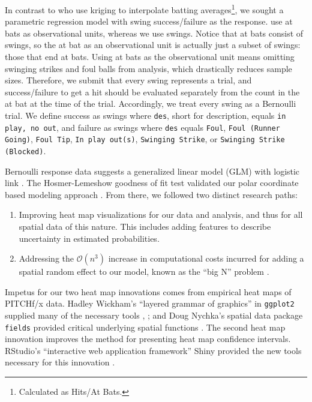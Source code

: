 In contrast to \cite{Cross2015} who use kriging to interpolate batting averages\footnote{Calculated as Hits/At Bats.}, we sought a parametric regression model with swing success/failure as the response. \cite{Cross2015} use at bats as observational units, whereas we use swings. Notice that at bats consist of swings, so the at bat as an observational unit is actually just a subset of swings: those that end at bats. Using at bats as the observational unit means omitting swinging strikes and foul balls from analysis, which drastically reduces sample sizes. Therefore, we submit that every swing represents a trial, and success/failure to get a hit should be evaluated separately from the count in the at bat at the time of the trial. Accordingly, we treat every swing as a Bernoulli trial. We define success as swings where \verb|des|, short for description, equals \verb|in play, no out|, and failure as swings where \verb|des| equals \verb|Foul|, \verb|Foul (Runner Going)|, \verb|Foul Tip|, \verb|In play out(s)|, \verb|Swinging Strike|, or \verb|Swinging Strike (Blocked)|.

Bernoulli response data suggests a generalized linear model (GLM) with logistic link \citep{Myers2012}. The Hosmer-Lemeshow goodness of fit test validated our polar coordinate based modeling approach \citep{Hosmer2013}. From there, we followed two distinct research paths:
\begin{enumerate}
\item Improving heat map visualizations for our data and analysis, and thus for all spatial data of this nature. This includes adding features to describe uncertainty in estimated probabilities.
\item Addressing the $\mathcal{O}(n^{3})$ increase in computational costs incurred for adding a spatial random effect to our model, known as the ``big N'' problem \citep{Finley2009}. 
\end{enumerate}
Impetus for our two heat map innovations comes from empirical heat maps of PITCHf/x\textsuperscript{\textregistered} data. Hadley Wickham's ``layered grammar of graphics'' in \verb|ggplot2| supplied many of the necessary tools \citep{Wickham2009}, \citep{Wickham2010}; and Doug Nychka's spatial data package \verb|fields| provided critical underlying spatial functions \citep{Nychka}. The second heat map innovation improves the method for presenting heat map confidence intervals. RStudio's ``interactive web application framework'' Shiny provided the new tools necessary for this innovation \citep{Shiny}.

